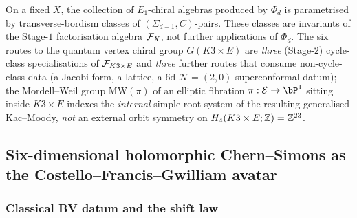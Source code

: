 \begin{corollary}
\label{wn:cor:spine-many-shadows}
On a fixed $X$, the collection of $E_1$-chiral algebras produced by
$\Phi_d$ is parametrised by transverse-bordism classes of
$(\Sigma_{d-1}, C)$-pairs. These classes are invariants of the
Stage-$1$ factorisation algebra $\mathcal{F}_X$, not further applications of
$\Phi_d$. The six routes to the quantum vertex chiral group
$G(K3 \times E)$ are \emph{three} (Stage-$2$) cycle-class
specialisations of $\mathcal{F}_{K3 \times E}$ and \emph{three} further routes
that consume non-cycle-class data (a Jacobi form, a lattice, a 6d
$\mathcal{N} = (2,0)$ superconformal datum); the Mordell--Weil group
$\mathrm{MW}(\pi)$ of an elliptic fibration $\pi: \mathcal{E} \to \bP^1$
sitting inside $K3 \times E$ indexes the \emph{internal} simple-root
system of the resulting generalised Kac--Moody, \emph{not} an external
orbit symmetry on $H_4(K3 \times E; \mathbb{Z}) = \mathbb{Z}^{23}$.
\end{corollary}

\subsection{Six-dimensional holomorphic Chern--Simons as the
Costello--Francis--Gwilliam avatar}
\label{wn:subsec:spine-6d-hCS}

\subsubsection{Classical BV datum and the shift law}

